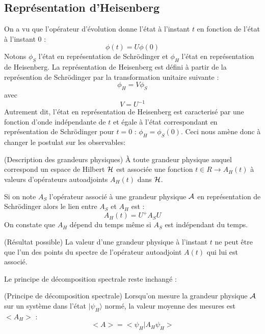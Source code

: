 \documentclass[12pt]{book}
\begin{document}
\subsection{Repr\'esentation d'Heisenberg}
On a vu que l'op\'erateur d'\'evolution donne l'\'etat \`a l'instant
$t$ en fonction de l'\'etat \`a l'instant $0$ :
\begin{equation}
\phi(t)=U\phi(0)
\end{equation}
Notons $\phi_S$ l'\'etat en repr\'esentation de Schr\"odinger et
$\phi_H$ l'\'etat en repr\'esentation de Heisenberg.
La repr\'esentation de Heisenberg est d\'efini \`a partir de la
repr\'esention de Schr\"odinger par la transformation unitaire
suivante :
\begin{equation}
\phi_H=V\phi_S
\end{equation}
avec 
\begin{equation}
V=U^{-1}
\end{equation}
Autrement dit, l'\'etat en repr\'esentation de Heisenberg est
caracteris\'e par une fonction d'onde ind\'ependante de $t$ et \'egale
\`a l'\'etat correspondant en repr\'esentation de Schr\"odinger pour
$t=0$ : $\phi_H=\phi_S(0)$.
Ceci nous am\`ene donc \`a changer le postulat sur les observables:
\begin{postulat}(Description des grandeurs physiques)
\`A toute grandeur physique auquel correspond un espace de Hilbert
${\cal H}$ est associ\'ee une fonction $t\in R\rightarrow A_H(t)$ \`a
valeurs d'op\'erateurs autoadjoints $A_H(t)$ dans ${\cal H}$.
\end{postulat}
Si on note $A_S$ l'op\'erateur associ\'e \`a une grandeur physique
$\cal A$ en repr\'esentation de Schr\"odinger alors le lien entre $A_S$
et $A_H$ est :
\begin{equation}
A_H(t)=U^+A_SU
\end{equation}
On constate que $A_H$ d\'epend du temps m\^eme si $A_S$ est
ind\'ependant du temps.
\begin{postulat}(R\'esultat possible)
La valeur d'une grandeur physique \`a l'instant $t$ ne peut \^etre que
l'un des points du spectre de l'op\'erateur autoadjoint $A(t)$ qui lui
est associ\'e.
\end{postulat}
Le principe de d\'ecomposition spectrale reste inchang\'e :
\begin{postulat}(Principe de d\'ecomposition spectrale)
Lorsqu'on mesure la grandeur physique $\cal A$ sur un syst\`eme dans
l'\'etat $|\psi_H \rangle $ norm\'e, la valeur moyenne des mesures est
$<A_H>$ :
\begin{equation}
<A>=<\psi_H|A_H\psi_H>
\end{equation}
\end{postulat}
\end{document}
